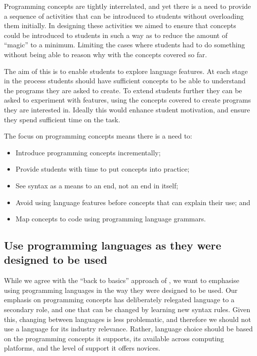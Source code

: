 Programming concepts are tightly interrelated, and yet there is a need to provide a sequence of activities that can be introduced to students without overloading them initially. In designing these activities we aimed to ensure that concepts could be introduced to students in such a way as to reduce the amount of ``magic'' to a minimum. Limiting the cases where students had to do something without being able to reason why with the concepts covered so far.

The aim of this is to enable students to explore language features. At each stage in the process students should have sufficient concepts to be able to understand the programs they are asked to create. To extend students further they can be asked to experiment with features, using the concepts covered to create programs they are interested in. Ideally this would enhance student motivation, and ensure they spend sufficient time on the task.

The focus on programming concepts means there is a need to:
\begin{itemize}[noitemsep,nolistsep]
	\item Introduce programming concepts incrementally;
	\item Provide students with time to put concepts into practice;
	\item See syntax as a means to an end, not an end in itself;
	\item Avoid using language features before concepts that can explain their use; and
	\item Map concepts to code using programming language grammars.
\end{itemize} 


\subsection{Use programming languages as they were designed to be used} %
\label{ssub:use_programming_languages_as_they_were_designed_to_be_used}

While we agree with the ``back to basics'' approach of \citet{Reges:2006}, we want to emphasise using programming languages in the way they were designed to be used. Our emphasis on programming concepts has deliberately relegated language to a secondary role, and one that can be changed by learning new syntax rules. Given this, changing between languages is less problematic, and therefore we should not use a language for its industry relevance. Rather, language choice should be based on the programming concepts it supports, its available across computing platforms, and the level of support it offers novices.

